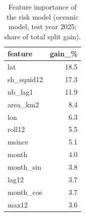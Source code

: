 \begin{table}[t]
\centering
\caption{Feature importance of the risk model (oceanic model, test year 2025; share of total split gain).}\label{tab:imp}
\small
\begin{tabular}{lr}
\toprule
feature & gain\_\% \\
\midrule
lat & 18.5 \\
sh\_squid12 & 17.3 \\
nb\_lag1 & 11.9 \\
area\_km2 & 8.4 \\
lon & 6.3 \\
roll12 & 5.5 \\
msince & 5.1 \\
month & 4.0 \\
month\_sin & 3.8 \\
lag12 & 3.7 \\
month\_cos & 3.7 \\
max12 & 3.6 \\
\bottomrule
\end{tabular}
\end{table}